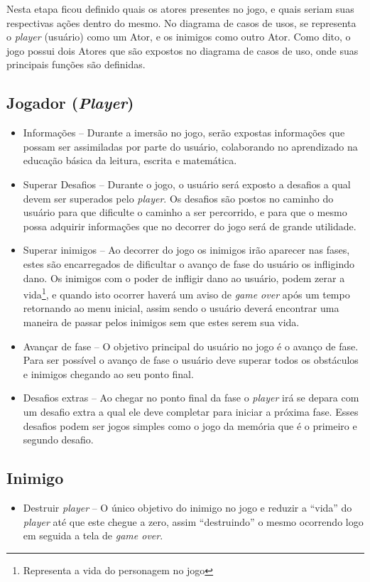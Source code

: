 \documentclass[
	12pt,				%
    oneside,			%
	a4paper,			%
	english,			%
	french,				%
	spanish,			%
	brazil,				%
	]{abntex2}
\begin{document}
		Nesta etapa ficou definido quais os atores presentes no jogo, e quais seriam suas respectivas ações dentro do mesmo. No diagrama de casos de usos, se representa o \textit{player} (usuário) como um Ator, e os inimigos como outro Ator. Como dito, o jogo possui dois Atores que são expostos no diagrama de casos de uso, onde suas principais funções são definidas.
	
		\subsection{Jogador (\textit{Player})}
		
			\begin{itemize}
				\item Informações – Durante a imersão no jogo, serão expostas informações que possam ser assimiladas por parte do usuário, colaborando no aprendizado na educação básica da leitura, escrita e matemática.
				\item Superar Desafios – Durante o jogo, o usuário será exposto a desafios a qual devem ser superados pelo \textit{player}. Os desafios são postos no caminho do usuário para que dificulte o caminho a ser percorrido, e para que o mesmo possa adquirir informações que no decorrer do jogo será de grande utilidade.
				\item Superar inimigos – Ao decorrer do jogo os inimigos irão aparecer nas fases, estes são encarregados de dificultar o avanço de fase do usuário os infligindo dano. Os inimigos com o poder de infligir dano ao usuário, podem zerar a vida\footnote{Representa a vida do personagem no jogo}, e quando isto ocorrer haverá um aviso de \textit{game over} após um tempo retornando ao menu inicial, assim sendo o usuário deverá encontrar uma maneira de passar pelos inimigos sem que estes serem sua vida.
				\item Avançar de fase – O objetivo principal do usuário no jogo é o avanço de fase. Para ser possível o avanço de fase o usuário deve superar todos os obstáculos e inimigos chegando ao seu ponto final.
				\item Desafios extras – Ao chegar no ponto final da fase o \textit{player} irá se depara com um desafio extra a qual ele deve completar para iniciar a próxima fase. Esses desafios podem ser jogos simples como o jogo da memória que é o primeiro e segundo desafio.
			\end{itemize}
		
		\subsection{Inimigo}
			\begin{itemize}
				\item Destruir \textit{player} – O único objetivo do inimigo no jogo e reduzir a “vida” do \textit{player} até que este chegue a zero, assim “destruindo” o mesmo ocorrendo logo em seguida a tela de \textit{game over}.
			\end{itemize}
		
\end{document}
